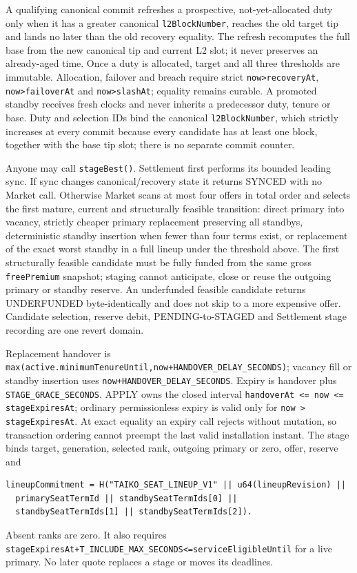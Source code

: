 \documentclass[a4paper,11pt]{article}
\newcommand{\code}[1]{\nolinkurl{#1}}
\begin{document}
A qualifying canonical commit refreshes a prospective, not-yet-allocated duty
only when it has a greater canonical \code{l2BlockNumber}, reaches the old target tip and
lands no later than the old recovery equality.  The refresh recomputes the full
base from the new canonical tip and current L2 slot; it never preserves an
already-aged time.  Once a duty is allocated, target and all three thresholds
are immutable.  Allocation, failover and breach require strict
\code{now>recoveryAt}, \code{now>failoverAt} and \code{now>slashAt}; equality
remains curable.  A promoted standby receives fresh clocks and never inherits a
predecessor duty, tenure or base.  Duty and selection IDs bind the canonical
\code{l2BlockNumber}, which strictly increases at every commit because every
candidate has at least one block, together with the base tip slot; there is no
separate commit counter.

Anyone may call \code{stageBest()}.  Settlement first performs its bounded
leading sync.  If sync changes canonical/recovery state it returns SYNCED with
no Market call.  Otherwise Market scans at most four offers in total order and
selects the first mature, current and structurally feasible transition: direct
primary into vacancy, strictly cheaper primary replacement preserving all
standbys, deterministic standby insertion when fewer than four terms exist, or
replacement of the exact worst standby in a full lineup under the threshold
above.
The first structurally feasible candidate must be fully funded from the same
gross \code{freePremium} snapshot; staging cannot anticipate, close or reuse
the outgoing primary or standby reserve.  An underfunded feasible candidate
returns UNDERFUNDED byte-identically and does not skip to a more expensive
offer.  Candidate selection, reserve debit, PENDING-to-STAGED and
Settlement stage recording are one revert domain.

Replacement handover is
\code{max(active.minimumTenureUntil,now+HANDOVER_DELAY_SECONDS)}; vacancy fill or
standby insertion uses \code{now+HANDOVER_DELAY_SECONDS}.  Expiry is handover
plus \code{STAGE_GRACE_SECONDS}.  APPLY owns the closed interval
\code{handoverAt <= now <= stageExpiresAt}; ordinary permissionless expiry is
valid only for \code{now > stageExpiresAt}.  At exact equality an expiry call
rejects without mutation, so transaction ordering cannot preempt the last valid
installation instant.  The stage binds target, generation, selected
rank, outgoing primary or zero, offer, reserve and
\begin{verbatim}
lineupCommitment = H("TAIKO_SEAT_LINEUP_V1" || u64(lineupRevision) ||
  primarySeatTermId || standbySeatTermIds[0] ||
  standbySeatTermIds[1] || standbySeatTermIds[2]).
\end{verbatim}
Absent ranks are zero.  It also requires
\code{stageExpiresAt+T_INCLUDE_MAX_SECONDS<=serviceEligibleUntil} for a live
primary.  No later quote replaces a stage or moves its deadlines.
\end{document}
